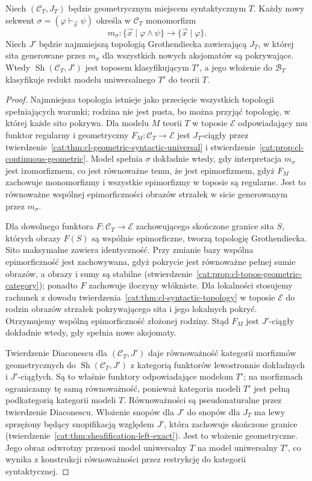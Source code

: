 \begin{stwierdzenie}\label{cat:prop:cl-axioms-topology}
Niech $(\mathcal C_T,J_T)$ będzie geometrycznym miejscem syntaktycznym $T$. Każdy nowy sekwent $\sigma=(\varphi\vdash_{\vec x}\psi)$ określa w $\mathcal C_T$ monomorfizm
\[
 m_\sigma:\{\vec x\mid\varphi\wedge\psi\}
 \longrightarrow\{\vec x\mid\varphi\}.
\]
Niech $J'$ będzie najmniejszą topologią Grothendiecka zawierającą $J_T$, w której sita generowane przez $m_\sigma$ dla wszystkich nowych aksjomatów są pokrywające. Wtedy $\operatorname{Sh}(\mathcal C_T,J')$ jest toposem klasyfikującym $T'$, a jego włożenie do $\mathcal B_T$ klasyfikuje redukt modelu uniwersalnego $T'$ do teorii $T$.
\end{stwierdzenie}
\begin{proof}
Najmniejsza topologia istnieje jako przecięcie wszystkich topologii spełniających warunki; rodzina nie jest pusta, bo można przyjąć topologię, w której każde sito pokrywa. Dla modelu $M$ teorii $T$ w toposie $\mathcal E$ odpowiadający mu funktor regularny i geometryczny $F_M:\mathcal C_T\to\mathcal E$ jest $J_T$-ciągły przez twierdzenie~\ref{cat:thm:cl-geometric-syntactic-universal} i stwierdzenie~\ref{cat:prop:cl-continuous-geometric}. Model spełnia $\sigma$ dokładnie wtedy, gdy interpretacja $m_\sigma$ jest izomorfizmem, co jest równoważne temu, że jest epimorfizmem, gdyż $F_M$ zachowuje monomorfizmy i wszystkie epimorfizmy w toposie są regularne. Jest to równoważne wspólnej epimorficzności obrazów strzałek w sicie generowanym przez $m_\sigma$.

Dla dowolnego funktora $F:\mathcal C_T\to\mathcal E$ zachowującego skończone granice sita $S$, których obrazy $F(S)$ są wspólnie epimorficzne, tworzą topologię Grothendiecka. Sito maksymalne zawiera identyczność. Przy zmianie bazy wspólna epimorficzność jest zachowywana, gdyż pokrycie jest równoważne pełnej sumie obrazów, a obrazy i sumy są stabilne (stwierdzenie~\ref{cat:prop:cl-topos-geometric-category}); ponadto $F$ zachowuje iloczyny włókniste. Dla lokalności stosujemy rachunek z dowodu twierdzenia~\ref{cat:thm:cl-syntactic-topology} w toposie $\mathcal E$ do rodzin obrazów strzałek pokrywającego sita i jego lokalnych pokryć. Otrzymujemy wspólną epimorficzność złożonej rodziny. Stąd $F_M$ jest $J'$-ciągły dokładnie wtedy, gdy spełnia nowe aksjomaty.

Twierdzenie Diaconescu dla $(\mathcal C_T,J')$ daje równoważność kategorii morfizmów geometrycznych do $\operatorname{Sh}(\mathcal C_T,J')$ z kategorią funktorów lewostronnie dokładnych i $J'$-ciągłych. Są to właśnie funktory odpowiadające modelom $T'$; na morfizmach ograniczamy tę samą równoważność, ponieważ kategoria modeli $T'$ jest pełną podkategorią kategorii modeli $T$. Równoważności są pseudonaturalne przez twierdzenie Diaconescu. Włożenie snopów dla $J'$ do snopów dla $J_T$ ma lewy sprzężony będący snopifikacją względem $J'$, która zachowuje skończone granice (twierdzenie~\ref{cat:thm:sheafification-left-exact}). Jest to włożenie geometryczne. Jego obraz odwrotny przenosi model uniwersalny $T$ na model uniwersalny $T'$, co wynika z konstrukcji równoważności przez restrykcję do kategorii syntaktycznej.
\end{proof}

